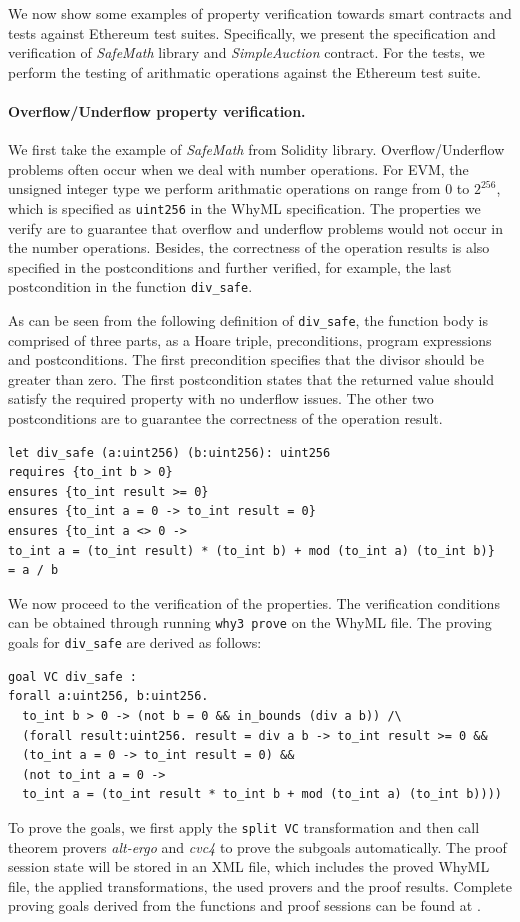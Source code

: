 \documentclass[runningheads]{llncs}
\begin{document}
We now show some examples of property verification towards smart contracts and tests against Ethereum 
test suites. Specifically, we present the specification and verification of \emph{SafeMath} library and \emph{SimpleAuction} contract.
For the tests, we perform the testing of arithmatic operations against the Ethereum test suite.

\paragraph{Overflow/Underflow property verification.}
We first take the example of \emph{SafeMath} from Solidity 
library. Overflow/Underflow problems often occur when we deal with number operations. For EVM, the unsigned integer type we 
perform arithmatic operations on range from 0 to $2^{256}$, which is specified as \texttt{uint256} in the WhyML specification.
The properties we verify are to guarantee that overflow and underflow problems would not occur in the number operations.
Besides, the correctness of the operation results is also specified in the postconditions and further verified, for example,
the last postcondition in the function \texttt{div\_safe}. 

As can be seen from the following definition of \texttt{div\_safe},
the function body is comprised of three parts, as a Hoare triple, 
preconditions, program expressions and postconditions.
The first precondition specifies that the divisor should be greater than
zero. The first postcondition states that the returned value should
satisfy the required property with no underflow issues. The other
two postconditions are to guarantee the correctness of the operation result. 
\begin{verbatim}
let div_safe (a:uint256) (b:uint256): uint256
requires {to_int b > 0}
ensures {to_int result >= 0}
ensures {to_int a = 0 -> to_int result = 0}
ensures {to_int a <> 0 -> 
to_int a = (to_int result) * (to_int b) + mod (to_int a) (to_int b)}
= a / b
\end{verbatim}

We now proceed to the verification of the properties. The verification conditions can be obtained 
through running \texttt{why3 prove} on the WhyML file. 
The proving goals for \texttt{div\_safe} are derived as follows:

\begin{verbatim}
goal VC div_safe :
forall a:uint256, b:uint256.
  to_int b > 0 -> (not b = 0 && in_bounds (div a b)) /\
  (forall result:uint256. result = div a b -> to_int result >= 0 &&
  (to_int a = 0 -> to_int result = 0) &&
  (not to_int a = 0 ->
  to_int a = (to_int result * to_int b + mod (to_int a) (to_int b))))
\end{verbatim}
To prove the goals, we first apply the \texttt{split VC} transformation and 
then call theorem provers \emph{alt-ergo} and \emph{cvc4} 
to prove the subgoals automatically. The proof session state will be 
stored in an XML file, which includes the proved WhyML file, the applied
transformations, the used provers and the proof results.
Complete proving goals derived from the functions and 
proof sessions can be found at \cite{Examples}.
\end{document}
